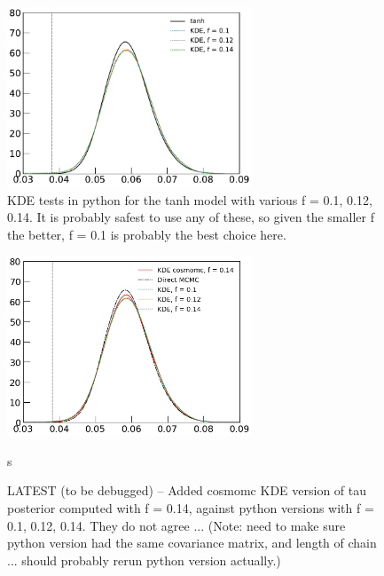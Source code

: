 \documentclass[prd,amsmath,amssymb,floatfix,superscriptaddress,nofootinbib]{revtex4-1}
\begin{document}
\begin{figure}
\includegraphics[width=0.65\textwidth]{python_kde/pl18_pc_zmax30_pliklite_srollv2_1015_tau_posterior_fraccov_1p0_burnin_10000_yes_norm_gaussian0p1_0p12_0p14.pdf}
\caption{KDE tests in python for the tanh model with various f = 0.1, 0.12, 0.14. It is probably safest to use any of these, so given the smaller f the better, f = 0.1 is probably the best choice here.
}
\label{fig:}
\end{figure}

\begin{figure}
\includegraphics[width=0.65\textwidth]{cosmomc_kde/direct_mcmc_vs_python_kde_and_cosmomc_kde_tanh_tau.png}
\caption{LATEST (to be debugged) -- Added cosmomc KDE version of tau posterior computed with f = 0.14, against python versions with f = 0.1, 0.12, 0.14. They do not agree ... (Note: need to make sure python version had the same covariance matrix, and length of chain ... should probably rerun python version actually.)
}
\label{fig:}s
\end{figure}
\end{document}
